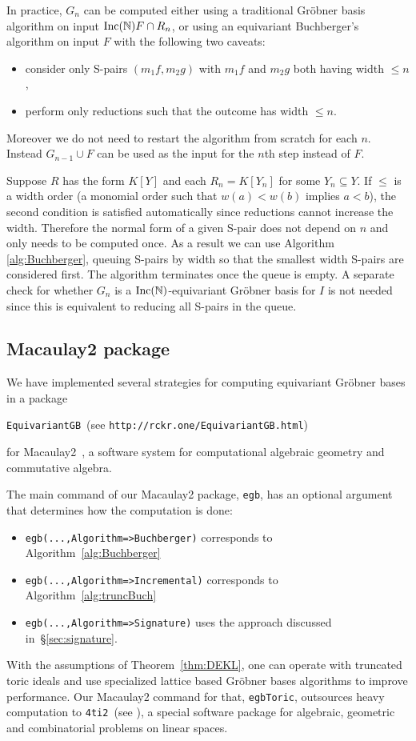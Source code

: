 In practice, $G_n$ can be computed either using a traditional Gr\"obner basis algorithm on input $\operatorname{Inc}(\mathbb N) F \cap R_n$, or using an equivariant Buchberger's algorithm on input $F$ with the following two caveats:
\begin{itemize}
 \item consider only S-pairs $(m_1f, m_2g)$ with $m_1f$ and $m_2g$ both having width $\leq n$,
 \item perform only reductions such that the outcome has width $\leq n$.
\end{itemize}
Moreover we do not need to restart the algorithm from scratch for each $n$.  Instead $G_{n-1} \cup F$ can be used as the input for the $n$th step instead of $F$.

Suppose $R$ has the form $K[Y]$ and each $R_n = K[Y_n]$ for some $Y_n \subseteq Y$.  If $\leq$ is a width order (a monomial order such that $w(a) < w(b)$ implies $a < b$), the second condition is satisfied automatically since reductions cannot increase the width.  Therefore the normal form of a given S-pair does not depend on $n$ and only needs to be computed once.  As a result we can use Algorithm \ref{alg:Buchberger}, queuing S-pairs by width so that the smallest width S-pairs are considered first.  The algorithm terminates once the queue is empty.  A separate check for whether $G_n$ is a $\operatorname{Inc}(\mathbb N)$-equivariant Gr\"obner basis for $I$ is not needed since this is equivalent to reducing all S-pairs in the queue.

\subsection{Macaulay2 package}

We have implemented several strategies for computing equivariant Gr\"obner bases in a package \begin{center}
\verb|EquivariantGB|~(see {\tt http://rckr.one/EquivariantGB.html}) 
\end{center}
for Macaulay2~\cite{grayson2002macaulay}, a software system for computational algebraic geometry and commutative algebra.

The main command of our Macaulay2 package, \verb|egb|, has an optional argument that determines how the computation is done:
\begin{itemize}
\item 
\verb|egb(...,Algorithm=>Buchberger)| corresponds to Algorithm~\ref{alg:Buchberger}
\item 
\verb|egb(...,Algorithm=>Incremental)| corresponds to Algorithm~\ref{alg:truncBuch}
\item 
\verb|egb(...,Algorithm=>Signature)| uses the approach discussed in~\S\ref{sec:signature}.
\end{itemize}

\begin{remark}\label{rem:4ti2}
With the assumptions of Theorem~\ref{thm:DEKL}, one can operate  with truncated toric ideals and use specialized lattice based Gr\"obner bases algorithms to improve performance. 
Our Macaulay2 command for that, \verb|egbToric|, outsources heavy computation to \verb|4ti2|~(see \cite{4ti2}),  a special software package for algebraic, geometric and combinatorial problems on linear spaces.   
\end{remark}
